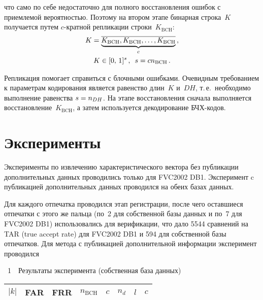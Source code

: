 \begin{multicols}{2}
\vspace*{9pt}

\addtocounter{figure}{1}

\noindent
 что само по 
себе недостаточно для полного восстановления ошибок с приемлемой вероятностью. 
Поэтому на втором этапе бинарная строка~$K$ получается путем $c$-крат\-ной 
репликации строки~$K_{\mathrm{BCH}}$:
      \begin{multline*}
      K=\underbrace{\overline{K_{\mathrm{BCH}},K_{\mathrm{BCH}},\ldots ,K_{\mathrm{BCH}}}}_c\,,\\
      K\in [0,\,1]^s\,,\enskip s=cn_{\mathrm{BCH}}\,.
      \end{multline*}


      Репликация помогает справиться с блочными ошибками. Очевидным требованием 
к параметрам кодирования является равенство длин~$K$ и~$DH$, т.\,е.\ необходимо 
выполнение равенства $s\hm = n_{DH}$. На этапе восстановления сначала выполняется 
восстановление~$K_{\mathrm{BCH}}$, а затем используется декодирование БЧХ-кодов.

\section{Эксперименты}

      Эксперименты по извлечению характеристического вектора без публикации 
дополнительных данных проводились только для FVC2002 DB1. Эксперимент c 
публикацией дополнительных данных проводился на обеих базах данных.
      
      Для каждого отпечатка проводился этап ре\-гист\-ра\-ции, после чего оставшиеся 
отпечатки с этого же пальца (по~2 для собственной базы данных и по~7 для FVC2002 DB1) 
использовались для верификации, что дало 5544 сравнений на TAR (true accept rate) 
для FVC2002 DB1 и 594 для собственной базы отпечатков. Для метода с 
публикацией дополнительной информации эксперимент проводился\linebreak\vspace*{-12pt}
\pagebreak

\noindent
{{\tablename~1}\ \ \small{Результаты эксперимента (собственная база данных)}}

\vspace*{3pt}

\begin{center}
\tabcolsep=6.1pt
{\small 
\begin{tabular}{|c|c|c|c|c|c|c|c|}
      \hline
$\vert k\vert$&FAR&FRR&$n_{\mathrm{BCH}}$&$c$&$n_d$&$l$&$c$\\
\hline
      

\end{tabular}}
\end{center}
\end{multicols}
